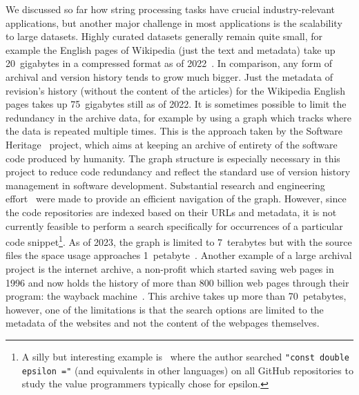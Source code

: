 We discussed so far how string processing tasks have crucial industry-relevant applications, but another major challenge in most applications is the scalability to large datasets.
Highly curated datasets generally remain quite small, for example the English pages of Wikipedia (just the text and metadata) take up 20~gigabytes in a compressed format as of 2022~\cite{wikimedia}. In comparison, any form of archival and version history tends to grow much bigger. Just the metadata of revision's history (without the content of the articles) for the Wikipedia English pages takes up 75~gigabytes still as of 2022.
It is sometimes possible to limit the redundancy in the archive data, for example by using a graph which tracks where the data is repeated multiple times. This is the approach taken by the Software Heritage~\cite{swh-site} project, which aims at keeping an archive of entirety of the software code produced by humanity. The graph structure is especially necessary in this project to reduce code redundancy and reflect the standard use of version history management in software development.
Substantial research and engineering effort~\cite{DBLP:phd/hal/Pietri21} were made to provide an efficient navigation of the graph. 
However, since the code repositories are indexed based on their URLs and metadata, it is not currently feasible to perform a search specifically for occurrences of a particular code snippet\footnote{\setlength\parindent{10pt} A silly but interesting example is~\cite{vii2014if} where the author searched \texttt{"const double epsilon ="} (and equivalents in other languages) on all GitHub repositories to study the value programmers typically chose for epsilon.}.
As of 2023, the graph is limited to 7~terabytes but with the source files the space usage approaches 1~petabyte~\cite{swh-polytechnique}.
Another example of a large archival project is the internet archive, a non-profit which started saving web pages in 1996 and now holds the history of more than 800 billion web pages through their program: the wayback machine~\cite{web-archive}. This archive takes up more than 70~petabytes, however, one of the limitations is that the search options are limited to the metadata of the websites and not the content of the webpages themselves.


